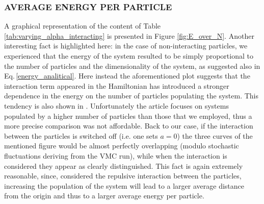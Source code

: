 \subsubsection*{AVERAGE ENERGY PER PARTICLE}
A graphical representation of the content of Table \ref{tab:varying_alpha_interacting} is presented in Figure \ref{fig:E_over_N}. Another interesting fact is highlighted here: in the case of non-interacting particles, we experienced that the energy of the system resulted to be simply proportional to the number of particles and the dimensionality of the system, as suggested also in Eq.\,\ref{energy_analitical}. Here instead the aforementioned plot suggests that the interaction term appeared in the Hamiltonian has introduced a stronger dependence in the energy on the number of particles populating the system. This tendency is also shown in \cite{duBois}. Unfortunately the article focuses on systems populated by a higher number of particles than those that we employed, thus a more precise comparison was not affordable. Back to our case, if the interaction between the particles is switched off (i.e. one sets $a=0$) the three curves of the mentioned figure would be almost perfectly overlapping (modulo stochastic fluctuations deriving from the VMC run), while when the interaction is considered they appear as clearly distinguished. This fact is again extremely reasonable, since, considered the repulsive interaction between the particles, increasing the population of the system will lead to a larger average distance from the origin and thus to a larger average energy per particle. \\

